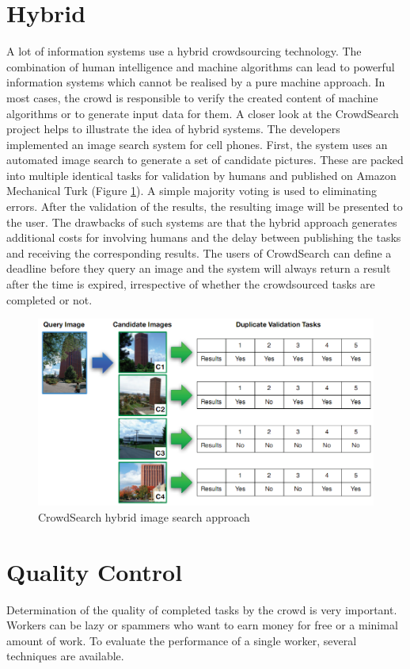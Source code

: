 \section{Hybrid}
A lot of information systems use a hybrid crowdsourcing technology. The combination of human intelligence and machine algorithms can lead to powerful information systems which cannot be realised by a pure machine approach. In most cases, the crowd is responsible to verify the created content of machine algorithms or to generate input data for them. 
A closer look at the CrowdSearch \cite{crowdsearch} project helps to illustrate the idea of hybrid systems. The developers implemented an image search system for cell phones. First, the system uses an automated image search to generate a set of candidate pictures. These are packed into multiple identical tasks for validation by humans and published on Amazon Mechanical Turk (Figure \ref{crowdsearch}). A simple majority voting is used to eliminating errors. After the validation of the results, the resulting image will be presented to the user. The drawbacks of such systems are that the hybrid approach generates additional costs for involving humans and the delay between publishing the tasks and receiving the corresponding results. The users of CrowdSearch can define a deadline before they query an image and the system will always return a result after the time is expired, irrespective of whether the crowdsourced tasks are completed or not. 
\begin{figure}
\centering
\includegraphics[scale=0.45]{images/crowdsearch_hybrid.png}
\caption{CrowdSearch hybrid image search approach}
\label{crowdsearch}
\end{figure}

\section{Quality Control}
Determination of the quality of completed tasks by the crowd is very important. Workers can be lazy or spammers who want to earn money for free or a minimal amount of work. To evaluate the performance of a single worker, several techniques are available. 
